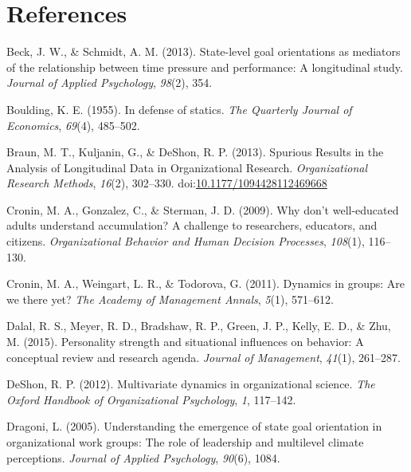 \documentclass[english,,man]{apa6}
\begin{document}
\newpage

\hypertarget{references}{%
\section{References}\label{references}}

\setlength{\parindent}{-0.5in}
\setlength{\leftskip}{0.5in}

\hypertarget{refs}{}
\leavevmode\hypertarget{ref-beck2013state}{}%
Beck, J. W., \& Schmidt, A. M. (2013). State-level goal orientations as mediators of the relationship between time pressure and performance: A longitudinal study. \emph{Journal of Applied Psychology}, \emph{98}(2), 354.

\leavevmode\hypertarget{ref-boulding1955defense}{}%
Boulding, K. E. (1955). In defense of statics. \emph{The Quarterly Journal of Economics}, \emph{69}(4), 485--502.

\leavevmode\hypertarget{ref-braun_spurious_2013}{}%
Braun, M. T., Kuljanin, G., \& DeShon, R. P. (2013). Spurious Results in the Analysis of Longitudinal Data in Organizational Research. \emph{Organizational Research Methods}, \emph{16}(2), 302--330. doi:\href{https://doi.org/10.1177/1094428112469668}{10.1177/1094428112469668}

\leavevmode\hypertarget{ref-cronin2009don}{}%
Cronin, M. A., Gonzalez, C., \& Sterman, J. D. (2009). Why don't well-educated adults understand accumulation? A challenge to researchers, educators, and citizens. \emph{Organizational Behavior and Human Decision Processes}, \emph{108}(1), 116--130.

\leavevmode\hypertarget{ref-cronin_dynamics_2011}{}%
Cronin, M. A., Weingart, L. R., \& Todorova, G. (2011). Dynamics in groups: Are we there yet? \emph{The Academy of Management Annals}, \emph{5}(1), 571--612.

\leavevmode\hypertarget{ref-dalal2015personality}{}%
Dalal, R. S., Meyer, R. D., Bradshaw, R. P., Green, J. P., Kelly, E. D., \& Zhu, M. (2015). Personality strength and situational influences on behavior: A conceptual review and research agenda. \emph{Journal of Management}, \emph{41}(1), 261--287.

\leavevmode\hypertarget{ref-deshon_multivariate_2012}{}%
DeShon, R. P. (2012). Multivariate dynamics in organizational science. \emph{The Oxford Handbook of Organizational Psychology}, \emph{1}, 117--142.

\leavevmode\hypertarget{ref-dragoni2005understanding}{}%
Dragoni, L. (2005). Understanding the emergence of state goal orientation in organizational work groups: The role of leadership and multilevel climate perceptions. \emph{Journal of Applied Psychology}, \emph{90}(6), 1084.
\end{document}
